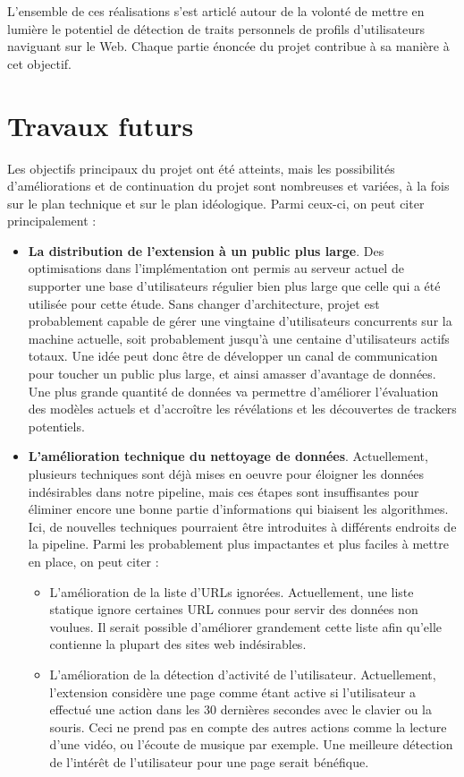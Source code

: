 		L'ensemble de ces réalisations s'est articlé autour de la volonté de mettre en lumière le potentiel de détection de traits personnels de profils d'utilisateurs naviguant sur le Web. Chaque partie énoncée du projet contribue à sa manière à cet objectif.

\section{Travaux futurs}

	Les objectifs principaux du projet ont été atteints, mais les possibilités d'améliorations et de continuation du projet sont nombreuses et variées, à la fois sur le plan technique et sur le plan idéologique. Parmi ceux-ci, on peut citer principalement :
	\begin{itemize}
		\item \textbf{La distribution de l'extension à un public plus large}. Des optimisations dans l'implémentation ont permis au serveur actuel de supporter une base d'utilisateurs régulier bien plus large que celle qui a été utilisée pour cette étude. Sans changer d'architecture, projet est probablement capable de gérer une vingtaine d'utilisateurs concurrents sur la machine actuelle, soit probablement jusqu'à une centaine d'utilisateurs actifs totaux. Une idée peut donc être de développer un canal de communication pour toucher un public plus large, et ainsi amasser d'avantage de données. Une plus grande quantité de données va permettre d'améliorer l'évaluation des modèles actuels et d'accroître les révélations et les découvertes de trackers potentiels.
		\item \textbf{L'amélioration technique du nettoyage de données}. Actuellement, plusieurs techniques sont déjà mises en oeuvre pour éloigner les données indésirables dans notre pipeline, mais ces étapes sont insuffisantes pour éliminer encore une bonne partie d'informations qui biaisent les algorithmes. Ici, de nouvelles techniques pourraient être introduites à différents endroits de la pipeline. Parmi les probablement plus impactantes et plus faciles à mettre en place, on peut citer :
		\begin{itemize}
			\item L'amélioration de la liste d'URLs ignorées. Actuellement, une liste statique ignore certaines URL connues pour servir des données non voulues. Il serait possible d'améliorer grandement cette liste afin qu'elle contienne la plupart des sites web indésirables.
			\item L'amélioration de la détection d'activité de l'utilisateur. Actuellement, l'extension considère une page comme étant active si l'utilisateur a effectué une action dans les 30 dernières secondes avec le clavier ou la souris. Ceci ne prend pas en compte des autres actions comme la lecture d'une vidéo, ou l'écoute de musique par exemple. Une meilleure détection de l'intérêt de l'utilisateur pour une page serait bénéfique.

\end{itemize}
\end{itemize}
